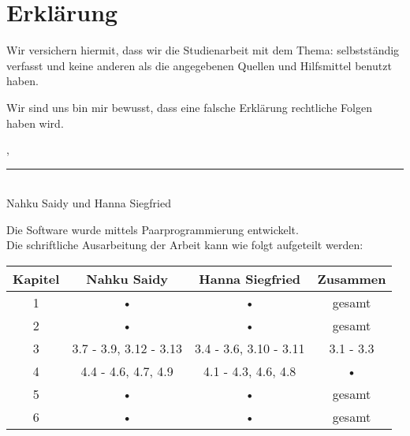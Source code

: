 
\thispagestyle{empty}

\section*{Erkl\"arung}
\vspace*{2em}

Wir versichern hiermit, dass wir die Studienarbeit mit dem Thema: {\itshape \titel} selbstst\"andig verfasst und keine anderen als die angegebenen Quellen und Hilfsmittel benutzt haben.

Wir sind uns bin mir bewusst, dass eine falsche Erklärung rechtliche Folgen haben wird.

\vspace{3em}

\abgabeort, \datumAbgabe
\vspace{4em}

\rule{6.8cm}{0.4pt}\\
Nahku Saidy und Hanna Siegfried

\vspace{4em}

Die Software wurde mittels Paarprogrammierung entwickelt.\\
Die schriftliche Ausarbeitung der Arbeit kann wie folgt aufgeteilt werden:

\begin{tabular}{c c c c}
\textbf{Kapitel} & \textbf{Nahku Saidy} & \textbf{Hanna Siegfried} & \textbf{Zusammen} \\ 
\hline 
1 & • & • & gesamt \\ 
2 & • & • & gesamt \\ 
3 & 3.7 - 3.9, 3.12 - 3.13 & 3.4 - 3.6, 3.10 - 3.11 & 3.1 - 3.3 \\ 
4 & 4.4 - 4.6, 4.7, 4.9 & 4.1 - 4.3, 4.6, 4.8 & • \\ 
5 & • & • & gesamt \\ 
6 & • & • & gesamt \\  
\end{tabular} 
